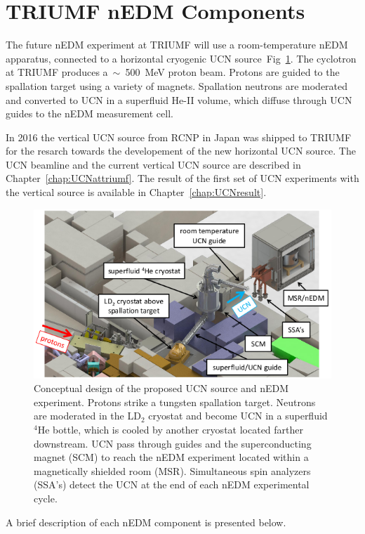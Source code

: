 \section{ TRIUMF nEDM Components}
The future nEDM experiment at TRIUMF will use a room-temperature nEDM
apparatus, connected to a horizontal cryogenic UCN
source~Fig~\ref{fig:triumfEDM}. 
The cyclotron at TRIUMF produces a~$\sim$~500~MeV proton beam. Protons
are guided to the spallation target using a variety of
magnets. Spallation neutrons are moderated and converted to UCN in a
superfluid He-II volume, which diffuse through UCN guides to the nEDM
measurement cell.

In 2016 the vertical UCN source from RCNP in Japan was shipped to TRIUMF for
the resarch towards the developement of the new horizontal UCN source.
The UCN beamline and the current vertical UCN source
are described in Chapter~\ref{chap:UCNattriumf}. The result of the
first set of UCN experiments with the vertical source is available in
Chapter~\ref{chap:UCNresult}.

\begin{figure}[h]
  \centering
  \includegraphics[width=1.0\textwidth]{edmtriumf.png}
  \caption{Conceptual design of the proposed UCN source and nEDM
    experiment. Protons strike a tungsten spallation target. Neutrons
    are moderated in the LD$_2$ cryostat and become UCN in a
    superfluid $^4$He bottle, which is cooled by another cryostat
    located farther downstream. UCN pass through guides and the
    superconducting magnet (SCM) to reach the nEDM experiment located
    within a magnetically shielded room (MSR). Simultaneous spin
    analyzers (SSA’s) detect the UCN at the end of each nEDM
    experimental cycle.  }
  \label{fig:triumfEDM}
\end{figure}

A brief description of each nEDM component is presented below.








